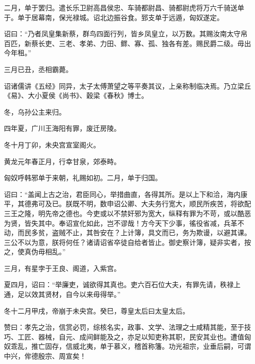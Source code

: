 \documentclass[12pt,UTF8]{ctexbook}
\begin{document}
二月，单于罢归。遣长乐卫尉高昌侯忠、车骑都尉昌、骑都尉虎将万六千骑送单于。单于居幕南，保光禄城。诏北边振谷食。郅支单于远遁，匈奴遂定。



诏曰：“乃者凤皇集新蔡，群鸟四面行列，皆乡凤皇立，以万数。其赐汝南太守帛百匹，新蔡长吏、三老、孝弟、力田、鳏、寡、孤、独各有差。赐民爵二级。毋出今年租。”



三月已丑，丞相霸薨。



诏诸儒讲《五经》同异，太子太傅萧望之等平奏其议，上亲称制临决焉。乃立梁丘《易》、大小夏侯《尚书》、穀梁《春秋》博士。



冬，乌孙公主来归。



四年夏，广川王海阳有罪，废迁房陵。



冬十月丁卯，未央宫宣室阁火。



黄龙元年春正月，行幸甘泉，郊泰畤。



匈奴呼韩邪单于来朝，礼赐如初。二月，单于归国。



诏曰：“盖闻上古之治，君臣同心，举措曲直，各得其所。是以上下和洽，海内康平，其德弗可及已。朕既不明，数申诏公卿、大夫务行宽大，顺民所疾苦，将欲配三王之隆，明先帝之德也。今吏或以不禁奸邪为宽大，纵释有罪为不苛，或以酷恶为贤，皆失其中。奉诏宣化如此，岂不谬哉！方今天下少事，徭役省减，兵革不动，而民多贫，盗贼不止，其咎安在？上计簿，具文而已，务为欺谩，以避其课。三公不以为意，朕将何任？诸请诏省卒徒自给者皆止。御史察计簿，疑非实者，按之，使真伪毋相乱。”



三月，有星孛于王良、阁道，入紫宫。



夏四月，诏曰：“举廉吏，诚欲得其真也。吏六百石位大夫，有罪先请，秩禄上通，足以效其贤材，自今以来毋得举。”



冬十二月甲戌，帝崩于未央宫。癸巳，尊皇太后曰太皇太后。



赞曰：孝先之治，信赏必罚，综核名实，政事、文学、法理之士咸精其能，至于技巧、工匠、器械，自元、成间鲜能及之，亦足以知吏称其职，民安其业也。遭值匈奴乖乱，推亡固存，信威北夷，单于慕义，稽首称籓。功光祖宗，业垂后嗣，可谓中兴，侔德殷宗、周宣矣！
\end{document}
